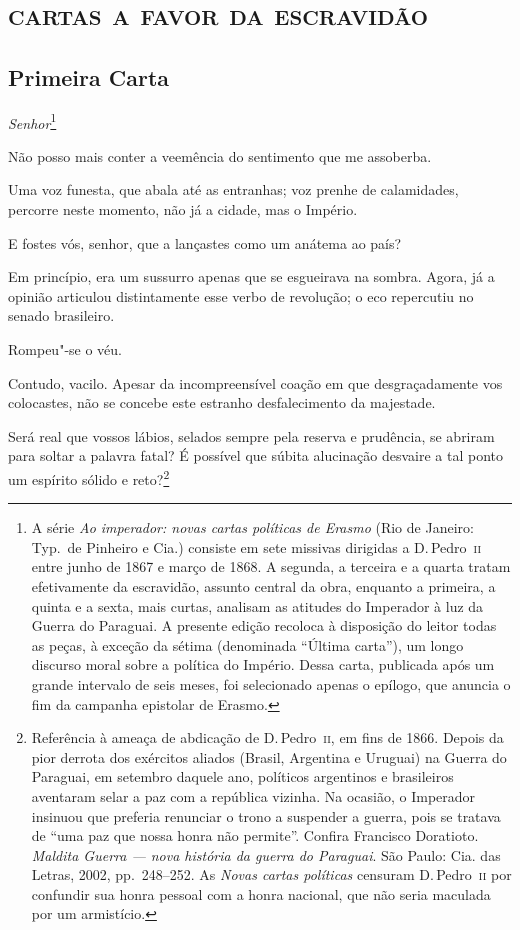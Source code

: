 \part{\textsc{cartas a favor da escravidão}}

\chapter{Primeira Carta}

\begin{linenumbers}

\noindent\textit{Senhor}\footnote{ A série \textit{Ao imperador: novas cartas políticas de Erasmo}
(Rio de Janeiro: Typ.~de Pinheiro e Cia.) consiste em sete missivas
dirigidas a D.\,Pedro~\textsc{ii} entre junho de 1867 e março de 1868. A segunda,
a terceira e a quarta tratam efetivamente da escravidão, assunto
central da obra, enquanto a primeira, a quinta e a sexta, mais curtas,
analisam as atitudes do Imperador à luz da Guerra do Paraguai. A
presente edição recoloca à disposição do leitor todas as peças, à
exceção da sétima (denominada ``Última carta''), um longo discurso moral sobre a política
do Império. Dessa carta, publicada após um grande intervalo de seis
meses, foi selecionado apenas o epílogo, que anuncia o fim da
campanha epistolar de Erasmo.}\smallskip

Não posso mais conter a veemência do sentimento que me assoberba. 

Uma voz funesta, que abala até as entranhas; voz prenhe de calamidades,
percorre neste momento, não já a cidade, mas o Império. 

E fostes vós, senhor, que a lançastes como um anátema ao país? 

Em princípio, era um sussurro apenas que se esgueirava na sombra.
Agora, já a opinião articulou distintamente esse verbo de revolução; o
eco repercutiu no senado brasileiro. 

 Rompeu"-se o véu. 

 Contudo, vacilo. Apesar da incompreensível coação em que
desgraçadamente vos colocastes, não se concebe este estranho
desfalecimento da majestade. 

 Será real que vossos lábios, selados sempre pela reserva e prudência,
se abriram para soltar a palavra fatal? É possível que súbita
alucinação desvaire a tal ponto um espírito sólido e
reto?\footnote{ Referência à ameaça de abdicação de D.\,Pedro~\textsc{ii}, em fins de 1866. Depois da pior
derrota dos exércitos aliados (Brasil, Argentina e Uruguai) na Guerra
do Paraguai, em setembro daquele ano, políticos argentinos e
brasileiros aventaram selar a paz com a república vizinha. Na ocasião,
o Imperador insinuou que preferia renunciar o trono a suspender a
guerra, pois se tratava de ``uma paz que nossa honra não permite''.
Confira Francisco Doratioto. \textit{Maldita Guerra --- nova história da
guerra do Paraguai}. São Paulo: Cia. das Letras, 2002, pp.~248--252.
As \textit{Novas cartas políticas} censuram D.\,Pedro~\textsc{ii} por confundir
sua honra pessoal com a honra nacional, que não seria maculada por um armistício.}
 

\end{linenumbers}

